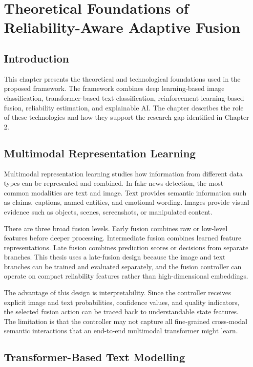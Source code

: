 \chapter{Theoretical Foundations of Reliability-Aware Adaptive Fusion}


\section{Introduction}


This chapter presents the theoretical and technological foundations used in the proposed framework. The framework combines deep learning-based image classification, transformer-based text classification, reinforcement learning-based fusion, reliability estimation, and explainable AI. The chapter describes the role of these technologies and how they support the research gap identified in Chapter 2.


\section{Multimodal Representation Learning}


Multimodal representation learning studies how information from different data types can be represented and combined. In fake news detection, the most common modalities are text and image. Text provides semantic information such as claims, captions, named entities, and emotional wording. Images provide visual evidence such as objects, scenes, screenshots, or manipulated content.


There are three broad fusion levels. Early fusion combines raw or low-level features before deeper processing. Intermediate fusion combines learned feature representations. Late fusion combines prediction scores or decisions from separate branches. This thesis uses a late-fusion design because the image and text branches can be trained and evaluated separately, and the fusion controller can operate on compact reliability features rather than high-dimensional embeddings.


The advantage of this design is interpretability. Since the controller receives explicit image and text probabilities, confidence values, and quality indicators, the selected fusion action can be traced back to understandable state features. The limitation is that the controller may not capture all fine-grained cross-modal semantic interactions that an end-to-end multimodal transformer might learn.


\section{Transformer-Based Text Modelling}


